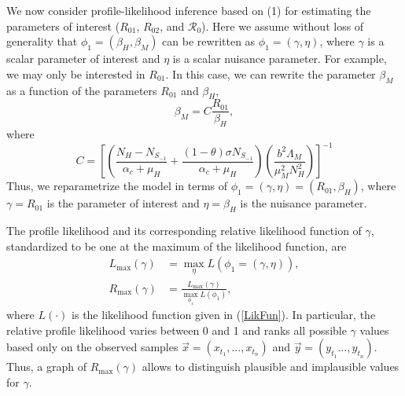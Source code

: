 \documentclass[draft, openbib]{imammb}
\numberwithin{equation}{section}
\begin{document}
        We now consider profile-likelihood inference based on (1) for
    estimating the parameters of interest ($R_{01}$, $R_{02}$, and
    $\mathcal{R}_{0}$). Here we assume without loss of generality that
    $\phi_{1}=\left(\beta_{H},\beta_{M}\right)$ can be rewritten as
    $\phi_{1}=\left(\gamma,\eta\right)$, where $\gamma$ is a scalar
    parameter of interest and $\eta$ is a scalar nuisance parameter. For
    example, we may only be interested in $R_{01}$. In this case, we can
    rewrite the parameter $\beta_{M}$ as a function of the parameters
    $R_{01}$ and $\beta_{H}$, 
    \begin{equation}
        \beta_{M}=C\frac{R_{01}}{\beta_{H}}, \nonumber
    \end{equation}
    where
    \begin{equation}
        C=\left[\left(\frac{N_H - N_{S_{-1}}}{\alpha_c + \mu_H}
            +\frac{(1- \theta ) \sigma N_{S_{-1}}}{ \alpha_c + \mu_H}\right)
            \left(\frac{b^2\Lambda_M}{\mu_M ^ 2  N_H ^ 2}\right)\right]^{-1} \nonumber
    \end{equation}
        Thus, we reparametrize the model in terms of 
    $\phi_{1}=\left(\gamma,\eta\right)=\left(R_{01},\beta_{H}\right)$, 
    where $\gamma=R_{01}$ is the parameter of interest and 
    $\eta=\beta_{H}$ is the nuisance parameter.

        The profile likelihood and its corresponding relative likelihood
    function of $\gamma$, standardized to be one at the maximum of the
    likelihood function, are 
    \begin{equation}
        \begin{split}
            L_{\max}
                \left(
                \gamma\right)&=\max_{\eta}L\left(\phi_{1}=\left(\gamma,\eta \right)
            \right),  \nonumber \\
            R_{\max}
            \left(
                \gamma\right)   
                &=  
                    \frac{L_{\max}\left(\gamma\right)}{\displaystyle\max_{\phi_{1}}L\left(\phi_{1}\right)},
        \end{split}
\end{equation}
where $L\left(\cdot\right)$ is the likelihood function given in
(\ref{LikFun}). In particular, the relative profile likelihood varies between
0 and 1 and ranks all possible $\gamma$ values based only on the observed
samples $\vec{x}=\left(x_{t_1}, \dots , x_{t_n} \right)$ and
$\vec{y}=\left(y_{t_1} \dots , y_{t_n} \right)$. Thus, a graph of
$R_{\max}\left(\gamma\right)$ allows to distinguish plausible and implausible
values for $\gamma$.
\end{document}
